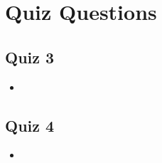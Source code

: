 \chapter{Quiz Questions}

\section{Quiz 3}
\begin{itemize}
  \item
\end{itemize}

\section{Quiz 4}
\begin{itemize}
  \item
\end{itemize}
